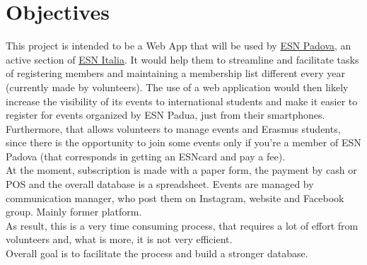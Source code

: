 \section{Objectives}

This project is intended to be a Web App that will be used by
\href{https://padova.esn.it/}{ESN Padova}, an active section of \href{https://esn.it/}{ESN Italia}.
It would help them to streamline and facilitate tasks of
registering members and maintaining a membership list different every year (currently made by volunteers).
The use of a web application would then likely increase the visibility of its events to international students
and make it easier to register for events organized by ESN Padua, just from their smartphones.\\
Furthermore, that allows volunteers to
manage events and Erasmus students, since there is the opportunity to join some events
only if you’re a member of ESN Padova (that corresponds in getting an ESNcard and pay a fee).\\
At the moment, subscription is made with a paper form, the payment by cash or POS and the overall database is a spreadsheet.
Events are managed by communication manager, who post them on Instagram, website and Facebook group. Mainly former platform.\\
As result, this is a very time consuming process, that requires a lot of effort from volunteers
and, what is more, it is not very efficient.\\
Overall goal is to facilitate the process and build a stronger database.